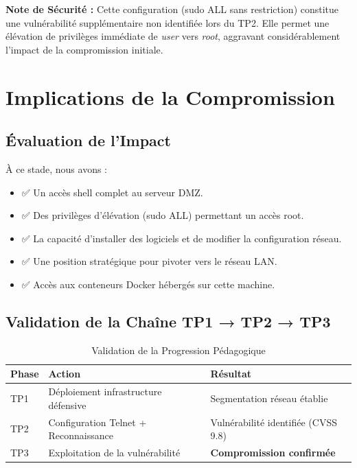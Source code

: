 \documentclass[12pt,a4paper,openany]{report}
\newcommand{\tableheadcolor}{\rowcolor{tableheadbg}}
\begin{document}
\textbf{Note de Sécurité :} Cette configuration (sudo ALL sans restriction) constitue une vulnérabilité supplémentaire non identifiée lors du TP2. Elle permet une élévation de privilèges immédiate de \textit{user} vers \textit{root}, aggravant considérablement l'impact de la compromission initiale.

\section{Implications de la Compromission}

\subsection{Évaluation de l'Impact}

À ce stade, nous avons :
\begin{itemize}
	\item ✅ Un accès shell complet au serveur DMZ.
	\item ✅ Des privilèges d'élévation (sudo ALL) permettant un accès root.
	\item ✅ La capacité d'installer des logiciels et de modifier la configuration réseau.
	\item ✅ Une position stratégique pour pivoter vers le réseau LAN.
	\item ✅ Accès aux conteneurs Docker hébergés sur cette machine.
\end{itemize}

\subsection{Validation de la Chaîne TP1 → TP2 → TP3}

\begin{table}[H]
	\centering
	\small
	\renewcommand{\arraystretch}{1.4}
	\setlength{\arrayrulewidth}{0.5pt}
	\begin{tabular}{p{2.5cm} p{5cm} p{5cm}}
		\arrayrulecolor{tableborder}
		\hline
		\tableheadcolor
		\textcolor{tableheadfg}{\textbf{Phase}} &
		\textcolor{tableheadfg}{\textbf{Action}} &
		\textcolor{tableheadfg}{\textbf{Résultat}} \\
		\hline
		\rowcolor{tablerowalt}
		TP1 & Déploiement infrastructure défensive & Segmentation réseau établie \\
		
		TP2 & Configuration Telnet + Reconnaissance & Vulnérabilité identifiée (CVSS 9.8) \\
		
		\rowcolor{tablerowalt}
		TP3 & Exploitation de la vulnérabilité & \textcolor{accent}{\textbf{Compromission confirmée}} \\
		\hline
	\end{tabular}
	\caption{Validation de la Progression Pédagogique}
	\label{tab:progression-validation}
\end{table}
\end{document}
